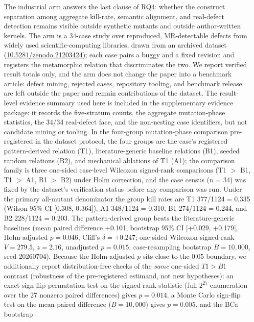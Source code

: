 \documentclass[manuscript,screen,review]{acmart}
\begin{document}
The industrial arm answers the last clause of RQ4: whether the
construct separation among aggregate kill-rate, semantic alignment, and
real-defect detection remains visible outside synthetic mutants and
outside author-written kernels. The arm is a 34-case study over
reproduced, MR-detectable defects from widely used scientific-computing
libraries, drawn from an archived dataset
\citep{defect4mr2026}
(\href{https://doi.org/10.5281/zenodo.21203424}{10.5281/zenodo.21203424});
each case pairs a buggy and a fixed revision and registers the
metamorphic relation that discriminates the two. We report verified
result totals only, and the arm does not change the
paper into a benchmark article:
defect mining, rejected cases, repository tooling, and benchmark release
are left outside the paper and remain contributions of the dataset. The result-level evidence summary used here is included
in the supplementary evidence package: it records the five-stratum counts,
the aggregate mutation-phase statistics, the 34/34 real-defect face, and
the non-nesting case identifiers, but not candidate mining or tooling. In
the four-group mutation-phase comparison pre-registered in the dataset
protocol, the four groups are the case's registered pattern-derived
relation (T1), literature-generic baseline relations (B1), seeded
random relations (B2), and mechanical ablations of T1 (A1); the
comparison family is three one-sided case-level Wilcoxon signed-rank
comparisons (T1 $>$ B1, T1 $>$ A1, B1 $>$ B2) under Holm correction,
and the case census (n = 34) was fixed by the dataset's verification
status before any comparison was run. Under the primary all-mutant
denominator the group kill rates are T1 377/1124 = 0.335 (Wilson 95\%
CI {[}0.308, 0.364{]}), A1 348/1124 = 0.310, B1 274/1124 = 0.244, and
B2 228/1124 = 0.203. The pattern-derived group beats the
literature-generic baselines (mean paired difference +0.101, bootstrap
95\% CI {[}+0.029, +0.179{]}, Holm-adjusted \(p=0.046\), Cliff's
\(\delta=+0.247\); one-sided Wilcoxon signed-rank \(V = 279.5\),
\(z = 2.16\), unadjusted \(p = 0.015\); case-resampling bootstrap
\(B = 10{,}000\), seed 20260704). Because the Holm-adjusted \(p\) sits
close to the 0.05 boundary, we additionally report distribution-free
checks of the \emph{same} one-sided \(T1 > B1\) contrast (robustness of
the pre-registered estimand, not new hypotheses): an exact sign-flip
permutation test on the signed-rank statistic (full \(2^{27}\)
enumeration over the 27 nonzero paired differences) gives
\(p = 0.014\), a Monte Carlo sign-flip test on the mean paired
difference (\(B = 10{,}000\)) gives \(p = 0.005\), and the BCa bootstrap
\end{document}
